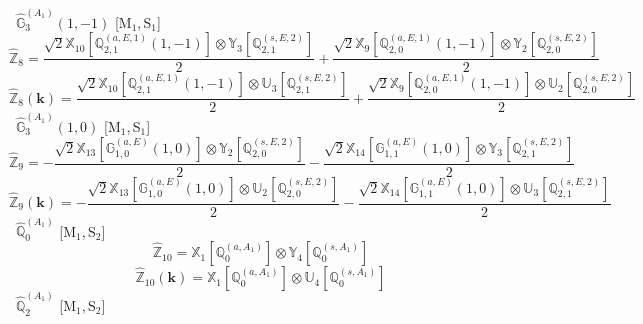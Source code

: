 \documentclass[fleqn,10pt,landscape]{article}
\begin{document}
\begin{itemize}
\begin{dmath*}
\end{dmath*}
\vspace{4mm}
\noindent {} $\,\,\,\hat{\mathbb{G}}_{3}^{(A_{1})}(1,-1)$ [M$_{1}$,\,S$_{1}$]
\begin{dmath*}
\hat{\mathbb{Z}}_{8}=\frac{\sqrt{2} \mathbb{X}_{10}[\mathbb{Q}_{2,1}^{(a,E,1)}(1,-1)] \otimes\mathbb{Y}_{3}[\mathbb{Q}_{2,1}^{(s,E,2)}]}{2} + \frac{\sqrt{2} \mathbb{X}_{9}[\mathbb{Q}_{2,0}^{(a,E,1)}(1,-1)] \otimes\mathbb{Y}_{2}[\mathbb{Q}_{2,0}^{(s,E,2)}]}{2}
\end{dmath*}
\begin{dmath*}
\hat{\mathbb{Z}}_{8}(\bm{k})=\frac{\sqrt{2} \mathbb{X}_{10}[\mathbb{Q}_{2,1}^{(a,E,1)}(1,-1)] \otimes\mathbb{U}_{3}[\mathbb{Q}_{2,1}^{(s,E,2)}]}{2} + \frac{\sqrt{2} \mathbb{X}_{9}[\mathbb{Q}_{2,0}^{(a,E,1)}(1,-1)] \otimes\mathbb{U}_{2}[\mathbb{Q}_{2,0}^{(s,E,2)}]}{2}
\end{dmath*}
\vspace{4mm}
\noindent {} $\,\,\,\hat{\mathbb{G}}_{3}^{(A_{1})}(1,0)$ [M$_{1}$,\,S$_{1}$]
\begin{dmath*}
\hat{\mathbb{Z}}_{9}=- \frac{\sqrt{2} \mathbb{X}_{13}[\mathbb{G}_{1,0}^{(a,E)}(1,0)] \otimes\mathbb{Y}_{2}[\mathbb{Q}_{2,0}^{(s,E,2)}]}{2} - \frac{\sqrt{2} \mathbb{X}_{14}[\mathbb{G}_{1,1}^{(a,E)}(1,0)] \otimes\mathbb{Y}_{3}[\mathbb{Q}_{2,1}^{(s,E,2)}]}{2}
\end{dmath*}
\begin{dmath*}
\hat{\mathbb{Z}}_{9}(\bm{k})=- \frac{\sqrt{2} \mathbb{X}_{13}[\mathbb{G}_{1,0}^{(a,E)}(1,0)] \otimes\mathbb{U}_{2}[\mathbb{Q}_{2,0}^{(s,E,2)}]}{2} - \frac{\sqrt{2} \mathbb{X}_{14}[\mathbb{G}_{1,1}^{(a,E)}(1,0)] \otimes\mathbb{U}_{3}[\mathbb{Q}_{2,1}^{(s,E,2)}]}{2}
\end{dmath*}
\vspace{4mm}
\noindent {} $\,\,\,\hat{\mathbb{Q}}_{0}^{(A_{1})}$ [M$_{1}$,\,S$_{2}$]
\begin{dmath*}
\hat{\mathbb{Z}}_{10}=\mathbb{X}_{1}[\mathbb{Q}_{0}^{(a,A_{1})}] \otimes\mathbb{Y}_{4}[\mathbb{Q}_{0}^{(s,A_{1})}]
\end{dmath*}
\begin{dmath*}
\hat{\mathbb{Z}}_{10}(\bm{k})=\mathbb{X}_{1}[\mathbb{Q}_{0}^{(a,A_{1})}] \otimes\mathbb{U}_{4}[\mathbb{Q}_{0}^{(s,A_{1})}]
\end{dmath*}
\vspace{4mm}
\noindent {} $\,\,\,\hat{\mathbb{Q}}_{2}^{(A_{1})}$ [M$_{1}$,\,S$_{2}$]
\begin{dmath*}

\end{dmath*}
\end{itemize}
\end{document}
